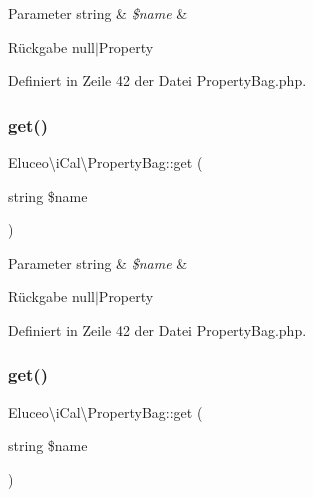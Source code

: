 \begin{DoxyParams}[1]{Parameter}
string & {\em \$name} & \\
\hline
\end{DoxyParams}
\begin{DoxyReturn}{Rückgabe}
null$\vert$\+Property 
\end{DoxyReturn}


Definiert in Zeile 42 der Datei Property\+Bag.\+php.

\mbox{\label{class_eluceo_1_1i_cal_1_1_property_bag_ab4e772a7ba80e988e259e4daacf50e76}} 
\subsubsection{\texorpdfstring{get()}{get()}\hspace{0.1cm}{\footnotesize\ttfamily [2/3]}}
{\footnotesize\ttfamily Eluceo\textbackslash{}i\+Cal\textbackslash{}\+Property\+Bag\+::get (\begin{DoxyParamCaption}\item[{string}]{\$name }\end{DoxyParamCaption})}


\begin{DoxyParams}[1]{Parameter}
string & {\em \$name} & \\
\hline
\end{DoxyParams}
\begin{DoxyReturn}{Rückgabe}
null$\vert$\+Property 
\end{DoxyReturn}


Definiert in Zeile 42 der Datei Property\+Bag.\+php.

\mbox{\label{class_eluceo_1_1i_cal_1_1_property_bag_ab4e772a7ba80e988e259e4daacf50e76}} 
\subsubsection{\texorpdfstring{get()}{get()}\hspace{0.1cm}{\footnotesize\ttfamily [3/3]}}
{\footnotesize\ttfamily Eluceo\textbackslash{}i\+Cal\textbackslash{}\+Property\+Bag\+::get (\begin{DoxyParamCaption}\item[{string}]{\$name }\end{DoxyParamCaption})}


